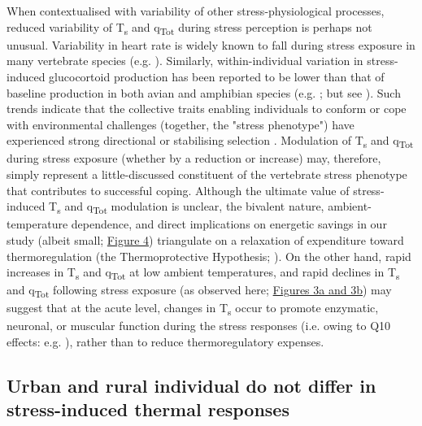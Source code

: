 \documentclass[12pt]{article}
\begin{document}
\noindent When contextualised with variability of other stress-physiological processes, reduced variability of T\textsubscript{s} and q\textsubscript{Tot} during stress perception is perhaps not unusual. Variability in heart rate is widely known to fall during stress exposure in many vertebrate species (e.g. \citealt{visser_2002,vonborell_2007,cyr_2009}). Similarly, within-individual variation in stress-induced glucocortoid production has been reported to be lower than that of baseline production in both avian and amphibian species (e.g. \citealt{cockrem_2002,rensel_2011,narayan_2012,grace_2014}; but see \citealt{narayan_2013,baugh_2014,lendvai_2015}). Such trends indicate that the collective traits enabling individuals to conform or cope with environmental challenges (together, the "stress phenotype") have experienced strong directional or stabilising selection \citep{ellis_2006}. Modulation of T\textsubscript{s} and q\textsubscript{Tot} during stress exposure (whether by a reduction or increase) may, therefore, simply represent a little-discussed constituent of the vertebrate stress phenotype that contributes to successful coping. Although the ultimate value of stress-induced T\textsubscript{s} and q\textsubscript{Tot} modulation is unclear, the bivalent nature, ambient-temperature dependence, and direct implications on energetic savings in our study (albeit small; \hyperref[Fig4.4]{Figure 4}) triangulate on a relaxation of expenditure toward thermoregulation (the Thermoprotective Hypothesis; \citealt{robertson_2020a}). On the other hand, rapid increases in T\textsubscript{s} and q\textsubscript{Tot} at low ambient temperatures, and rapid declines in T\textsubscript{s} and q\textsubscript{Tot} following stress exposure (as observed here; \hyperref[Fig4.3]{Figures 3a and 3b}) may suggest that at the acute level, changes in T\textsubscript{s} occur to promote enzymatic, neuronal, or muscular function during the stress responses (i.e. owing to Q10 effects: e.g. \citealt{carr_2013}), rather than to reduce thermoregulatory expenses.\vspace{0.5cm}
 
\subsection{Urban and rural individual do not differ in stress-induced thermal responses}
\vspace{0.5cm}
\end{document}
